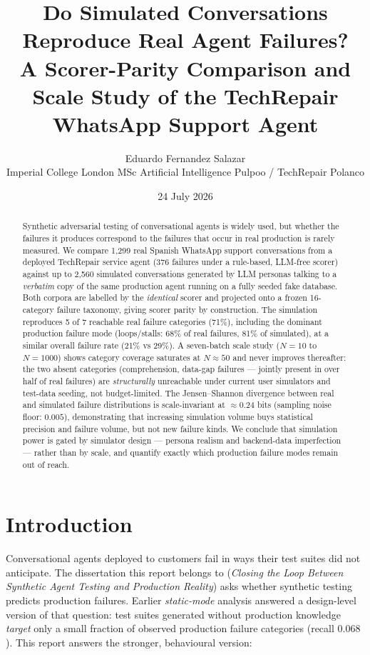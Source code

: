 \documentclass[11pt,a4paper]{article}
\title{\textbf{Do Simulated Conversations Reproduce Real Agent Failures?}\\
\large A Scorer-Parity Comparison and Scale Study of the TechRepair WhatsApp Support Agent}
\author{Eduardo Fernandez Salazar\\
\small Imperial College London \;\textperiodcentered\; MSc Artificial Intelligence \;\textperiodcentered\; Pulpoo / TechRepair Polanco}
\date{24 July 2026}
\begin{document}
\maketitle

\begin{abstract}
\noindent
Synthetic adversarial testing of conversational agents is widely used, but whether the failures
it produces correspond to the failures that occur in real production is rarely measured. We compare
1{,}299 real Spanish WhatsApp support conversations from a deployed TechRepair service agent
(376 failures under a rule-based, LLM-free scorer) against up to 2{,}560 simulated conversations
generated by LLM personas talking to a \emph{verbatim} copy of the same production agent running
on a fully seeded fake database. Both corpora are labelled by the \emph{identical} scorer and
projected onto a frozen 16-category failure taxonomy, giving scorer parity by construction.
The simulation reproduces 5 of 7 reachable real failure categories (71\%), including the dominant
production failure mode (loops/stalls: 68\% of real failures, 81\% of simulated), at a similar
overall failure rate (21\% vs 29\%). A seven-batch scale study ($N=10$ to $N=1000$) shows category
coverage saturates at $N\!\approx\!50$ and never improves thereafter: the two absent categories
(comprehension, data-gap failures --- jointly present in over half of real failures) are
\emph{structurally} unreachable under current user simulators and test-data seeding, not
budget-limited. The Jensen--Shannon divergence between real and simulated failure distributions is
scale-invariant at $\approx 0.24$ bits (sampling noise floor: $0.005$), demonstrating that
increasing simulation volume buys statistical precision and failure volume, but not new failure
kinds. We conclude that simulation power is gated by simulator design --- persona realism and
backend-data imperfection --- rather than by scale, and quantify exactly which production failure
modes remain out of reach.
\end{abstract}

\section{Introduction}

Conversational agents deployed to customers fail in ways their test suites did not anticipate.
The dissertation this report belongs to (\emph{Closing the Loop Between Synthetic Agent Testing
and Production Reality}) asks whether synthetic testing predicts production failures. Earlier
\emph{static-mode} analysis answered a design-level version of that question: test suites
generated without production knowledge \emph{target} only a small fraction of observed production
failure categories (recall $0.068$). This report answers the stronger, behavioural version:
\end{document}

